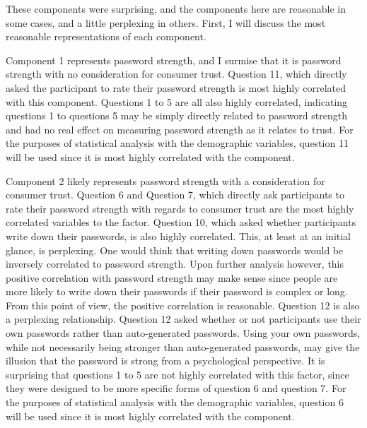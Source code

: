 \documentclass[letterpaper, 10 pt, conference]{ieeeconf}  %
\begin{document}
These components were surprising, and the components here are reasonable in some cases, and a little perplexing in others. First, I will discuss the most reasonable representations of each component. 

Component 1 represents password strength, and I surmise that it is password strength with no consideration for consumer trust. Question 11, which directly asked the participant to rate their password strength is most highly correlated with this component. Questions 1 to 5 are all also highly correlated, indicating questions 1 to questions 5 may be simply directly related to password strength and had no real effect on measuring password strength as it relates to trust. For the purposes of statistical analysis with the demographic variables, question 11 will be used since it is most highly correlated with the component.

Component 2 likely represents password strength with a consideration for consumer trust. Question 6 and Question 7, which directly ask participants to rate their password strength with regards to consumer trust are the most highly correlated variables to the factor. Question 10, which asked whether participants write down their passwords, is also highly correlated. This, at least at an initial glance, is perplexing. One would think that writing down passwords would be inversely correlated to password strength. Upon further analysis however, this positive correlation with password strength may make sense since people are more likely to write down their passwords if their password is complex or long. From this point of view, the positive correlation is reasonable. Question 12 is also a perplexing relationship. Question 12 asked whether or not participants use their own passwords rather than auto-generated passwords. Using your own passwords, while not necessarily being stronger than auto-generated passwords, may give the illusion that the password is strong from a psychological perspective. It is surprising that questions 1 to 5 are not highly correlated with this factor, since they were designed to be more specific forms of question 6 and question 7. For the purposes of statistical analysis with the demographic variables, question 6 will be used since it is most highly correlated with the component.
\end{document}

